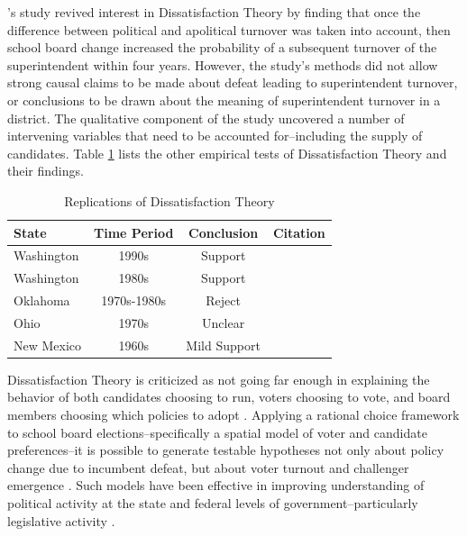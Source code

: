 \citet{RefWorks:311}'s study revived interest in Dissatisfaction Theory by finding that once the difference between political and apolitical turnover was taken into account, then school board change increased the probability of a subsequent turnover of the superintendent within four years. However, the study's methods did not allow strong causal claims to be made about defeat leading to superintendent turnover, or conclusions to be drawn about the meaning of superintendent turnover in a district. The qualitative component of the study uncovered a number of intervening variables that need to be accounted for--including the supply of candidates. Table \ref{dtheoryrep} lists the other empirical tests of Dissatisfaction Theory and their findings.


\begin{table}[h!]
\begin{center}
\begin{small}
\caption{Replications of Dissatisfaction Theory}
\label{dtheoryrep}
\begin{tabular}{| l | c | c | c |}
\hline
\textbf{State}  & \textbf{Time Period} & \textbf{Conclusion} & \textbf{Citation} \\ \hline
Washington  & 1990s & Support & \citet{RefWorks:311} \\ \hline
Washington & 1980s & Support & \citet{RefWorks:245} \\ \hline
Oklahoma & 1970s-1980s & Reject & \citet{RefWorks:247} \\ \hline
Ohio & 1970s & Unclear &  \citet{RefWorks:259,RefWorks:337} \\ \hline
New Mexico & 1960s & Mild Support & \citet{RefWorks:341} \\ \hline
\end{tabular}
\end{small}
\end{center}
\end{table}

Dissatisfaction Theory is criticized as not going far enough in explaining the behavior of both candidates choosing to run, voters choosing to vote, and board members choosing which policies to adopt \citep{RefWorks:336,RefWorks:340,RefWorks:339}. Applying a rational choice framework to school board elections--specifically a spatial model of voter and candidate preferences--it is possible to generate testable hypotheses not only about policy change due to incumbent defeat, but about voter turnout and challenger emergence \citep{RefWorks:243}. Such models have been effective in improving understanding of political activity at the state and federal levels of government--particularly legislative activity \citep{RefWorks:350,RefWorks:349,RefWorks:352}. 

